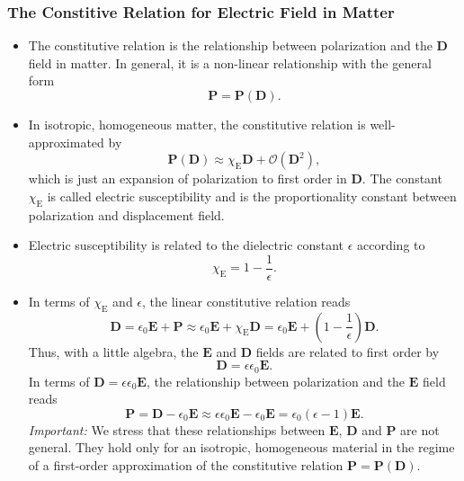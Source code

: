\documentclass[11pt, a4paper]{article}
\renewcommand{\vec}[1]{\bm{#1}} %
\newcommand{\E}{\vec{E}} %
\newcommand{\D}{\vec{D}}  %
\renewcommand{\P}{\vec{P}}  %
\newcommand{\ee}{\epsilon_{0}}  %
\begin{document}
\subsubsection{The Constitive Relation for Electric Field in Matter} \label{sss:const-rel-electric}
\begin{itemize}
    \item The constitutive relation is the relationship between polarization and the $ \D $ field in matter. In general, it is a non-linear relationship with the general form
	\begin{equation*}
		\P = \P(\D).
	\end{equation*}


    \item In isotropic, homogeneous matter, the constitutive relation is well-approximated by
	\begin{equation*}
		\P(\D) \approx \chi_{\text{E}} \D + \mathcal{O}(\D^{2}),
	\end{equation*}
    which is just an expansion of polarization to first order in $ \D $. The constant $ \chi_{\text{E}} $ is called electric susceptibility and is the proportionality constant between polarization and displacement field.

    \item Electric susceptibility is related to the dielectric constant $ \epsilon $ according to
	\begin{equation*}
        \chi_{\text{E}} = 1 - \frac{1}{\epsilon}.
	\end{equation*}
	
	\item In terms of $ \chi_{\text{E}} $ and $ \epsilon $, the linear constitutive relation reads
	\begin{equation*}
        \D = \ee \E + \P \approx \ee \E + \chi_{\text{E}} \D = \ee \E + \left( 1 - \frac{1}{\epsilon} \right) \D.
	\end{equation*}
	Thus, with a little algebra, the $ \E $ and $ \D $ fields are related to first order by
	\begin{equation*}
        \D = \epsilon \ee \E.
	\end{equation*}
    In terms of $ \D = \epsilon \ee \E $, the relationship between polarization and the $ \E $ field reads
	\begin{equation*}
        \P = \D - \ee \E \approx \epsilon \ee \E - \ee \E = \ee (\epsilon - 1)\E.
	\end{equation*}
    \textit{Important:} We stress that these relationships between $ \E $, $ \D $ and $ \P $ are not general. They hold only for an isotropic, homogeneous material in the regime of a first-order approximation of the constitutive relation $ \P = \P(\D) $.
	
\end{itemize}
\end{document}
